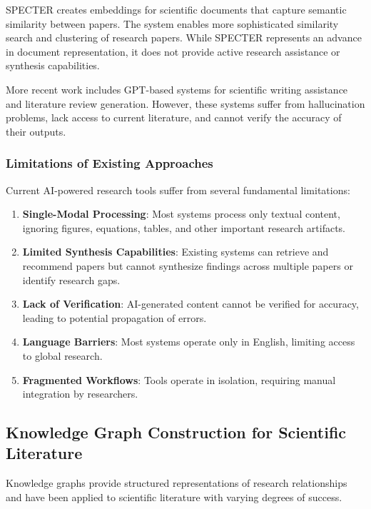 \documentclass[10pt,twocolumn]{article}
\begin{document}
SPECTER \cite{cohan2020specter} creates embeddings for scientific documents that capture semantic similarity between papers. The system enables more sophisticated similarity search and clustering of research papers. While SPECTER represents an advance in document representation, it does not provide active research assistance or synthesis capabilities.

More recent work includes GPT-based systems for scientific writing assistance and literature review generation. However, these systems suffer from hallucination problems, lack access to current literature, and cannot verify the accuracy of their outputs.

\subsubsection{Limitations of Existing Approaches}

Current AI-powered research tools suffer from several fundamental limitations:

\begin{enumerate}
    \item \textbf{Single-Modal Processing}: Most systems process only textual content, ignoring figures, equations, tables, and other important research artifacts.
    
    \item \textbf{Limited Synthesis Capabilities}: Existing systems can retrieve and recommend papers but cannot synthesize findings across multiple papers or identify research gaps.
    
    \item \textbf{Lack of Verification}: AI-generated content cannot be verified for accuracy, leading to potential propagation of errors.
    
    \item \textbf{Language Barriers}: Most systems operate only in English, limiting access to global research.
    
    \item \textbf{Fragmented Workflows}: Tools operate in isolation, requiring manual integration by researchers.
\end{enumerate}

\subsection{Knowledge Graph Construction for Scientific Literature}

Knowledge graphs provide structured representations of research relationships and have been applied to scientific literature with varying degrees of success.
\end{document}
